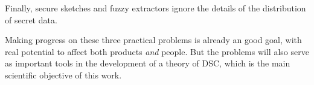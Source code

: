 Finally, secure
sketches and fuzzy extractors ignore the details of the distribution of secret
data. 



Making progress on these three practical problems is already an good
goal, with real potential to affect both products \textit{and} people.  But the
problems will also serve as important tools in the development of a
theory of DSC, which is the main scientific objective of this work.

